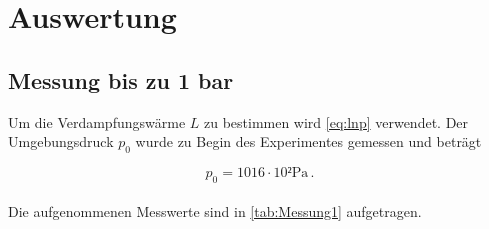 \section{Auswertung}
\label{sec:auswertung}

\subsection{Messung bis zu 1 bar}
\label{subsec:Auswertung_a}
Um die Verdampfungswärme $L$ zu bestimmen wird \eqref{eq:lnp} verwendet. 
Der Umgebungsdruck $p_0$ wurde zu Begin des Experimentes gemessen und beträgt 

\begin{equation*}
    p_0 = 1016 \cdot 10² \unit{\pascal}    \,.
\end{equation*} \\

Die aufgenommenen Messwerte sind in \autoref{tab:Messung1} aufgetragen.

